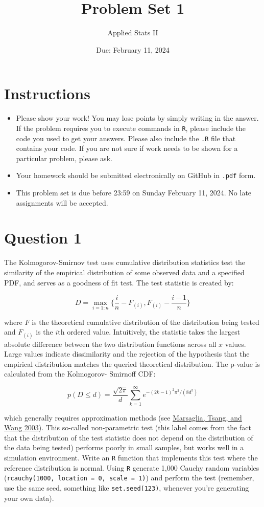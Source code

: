 \documentclass[12pt,letterpaper]{article}
\title{Problem Set 1}
\date{Due: February 11, 2024}
\author{Applied Stats II}
\begin{document}
	\maketitle
	\section*{Instructions}
	\begin{itemize}
	\item Please show your work! You may lose points by simply writing in the answer. If the problem requires you to execute commands in \texttt{R}, please include the code you used to get your answers. Please also include the \texttt{.R} file that contains your code. If you are not sure if work needs to be shown for a particular problem, please ask.
\item Your homework should be submitted electronically on GitHub in \texttt{.pdf} form.
\item This problem set is due before 23:59 on Sunday February 11, 2024. No late assignments will be accepted.
	\end{itemize}

	\vspace{.25cm}
\section*{Question 1} 
\vspace{.25cm}
\noindent The Kolmogorov-Smirnov test uses cumulative distribution statistics test the similarity of the empirical distribution of some observed data and a specified PDF, and serves as a goodness of fit test. The test statistic is created by:

$$D = \max_{i=1:n} \Big\{ \frac{i}{n}  - F_{(i)}, F_{(i)} - \frac{i-1}{n} \Big\}$$

\noindent where $F$ is the theoretical cumulative distribution of the distribution being tested and $F_{(i)}$ is the $i$th ordered value. Intuitively, the statistic takes the largest absolute difference between the two distribution functions across all $x$ values. Large values indicate dissimilarity and the rejection of the hypothesis that the empirical distribution matches the queried theoretical distribution. The p-value is calculated from the Kolmogorov-
Smirnoff CDF:

$$p(D \leq d)= \frac{\sqrt {2\pi}}{d} \sum _{k=1}^{\infty }e^{-(2k-1)^{2}\pi ^{2}/(8d^{2})}$$


\noindent which generally requires approximation methods (see \href{https://core.ac.uk/download/pdf/25787785.pdf}{Marsaglia, Tsang, and Wang 2003}). This so-called non-parametric test (this label comes from the fact that the distribution of the test statistic does not depend on the distribution of the data being tested) performs poorly in small samples, but works well in a simulation environment. Write an \texttt{R} function that implements this test where the reference distribution is normal. Using \texttt{R} generate 1,000 Cauchy random variables (\texttt{rcauchy(1000, location = 0, scale = 1)}) and perform the test (remember, use the same seed, something like \texttt{set.seed(123)}, whenever you're generating your own data).\\
	
\end{document}
